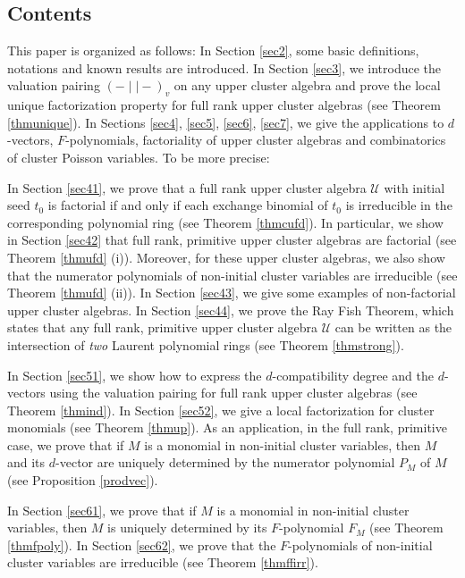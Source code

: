 \documentclass{amsart}
\theoremstyle{definition}
\theoremstyle{remark}
\numberwithin{equation}{section}
\begin{document}
\subsection{Contents}


This paper is organized as follows: In Section \ref{sec2}, some basic definitions, notations and known results are introduced. In Section \ref{sec3}, we  introduce the valuation pairing $(-\mid\mid  -)_v$ on any upper cluster algebra and prove the local unique factorization property for full rank  upper cluster algebras (see Theorem \ref{thmunique}). In Sections \ref{sec4}, \ref{sec5}, \ref{sec6}, \ref{sec7}, we give the applications to $d$-vectors, $F$-polynomials,  factoriality of upper cluster algebras and combinatorics of cluster Poisson variables. To be more precise:


In Section \ref{sec41}, we prove that a full rank upper cluster algebra $\mathcal U$ with initial seed $t_0$ is factorial  if and only if each exchange binomial of $t_0$ is irreducible in the corresponding polynomial ring (see Theorem \ref{thmcufd}). In particular, we show in Section \ref{sec42} that full rank, primitive upper cluster algebras are factorial (see Theorem \ref{thmufd} (i)). Moreover, for these upper cluster algebras, we also show that the numerator polynomials of non-initial cluster variables are irreducible (see Theorem \ref{thmufd} (ii)). In Section \ref{sec43}, we give some examples of non-factorial upper cluster algebras. In Section \ref{sec44}, we prove the  Ray Fish Theorem, which states that any full rank, primitive upper cluster algebra $\mathcal U$ can be written as the intersection of {\em two} Laurent polynomial rings (see Theorem \ref{thmstrong}).



In Section \ref{sec51},  we show how to express the $d$-compatibility degree and the $d$-vectors using the valuation pairing for full rank upper cluster algebras (see Theorem \ref{thmind}). In Section \ref{sec52}, we give a local factorization for cluster monomials (see Theorem \ref{thmup}). As an application, in the full rank, primitive case, we prove that if $M$ is a monomial in non-initial cluster variables, then $M$ and its $d$-vector are uniquely determined by the numerator polynomial $P_M$ of $M$ (see Proposition \ref{prodvec}).


 In Section \ref{sec61},  we prove that  if $M$ is a monomial in non-initial cluster variables, then $M$ is uniquely determined by its $F$-polynomial $F_M$ (see Theorem \ref{thmfpoly}).  In Section \ref{sec62}, we  prove that the $F$-polynomials of non-initial cluster variables are irreducible (see Theorem \ref{thmffirr}).
\end{document}
